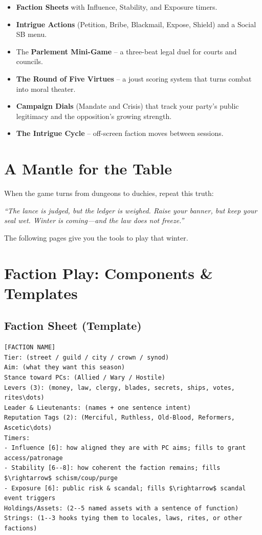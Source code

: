 \documentclass[11pt]{article}
\begin{document}
\begin{itemize}
    \item \textbf{Faction Sheets} with Influence, Stability, and Exposure timers.
    \item \textbf{Intrigue Actions} (Petition, Bribe, Blackmail, Expose, Shield) and a Social SB menu.
    \item The \textbf{Parlement Mini-Game} -- a three-beat legal duel for courts and councils.
    \item \textbf{The Round of Five Virtues} -- a joust scoring system that turns combat into moral theater.
    \item \textbf{Campaign Dials} (Mandate and Crisis) that track your party's public legitimacy and the opposition's growing strength.
    \item \textbf{The Intrigue Cycle} -- off-screen faction moves between sessions.
\end{itemize}

\section*{A Mantle for the Table}

When the game turns from dungeons to duchies, repeat this truth:

\medskip
\noindent\textit{``The lance is judged, but the ledger is weighed. Raise your banner, but keep your seal wet. Winter is coming---and the law does not freeze.''}

\medskip
The following pages give you the tools to play that winter.

\section{Faction Play: Components \& Templates}
\subsection{Faction Sheet (Template)}
\begin{verbatim}
[FACTION NAME]
Tier: (street / guild / city / crown / synod)
Aim: (what they want this season)
Stance toward PCs: (Allied / Wary / Hostile)
Levers (3): (money, law, clergy, blades, secrets, ships, votes, rites\dots)
Leader & Lieutenants: (names + one sentence intent)
Reputation Tags (2): (Merciful, Ruthless, Old-Blood, Reformers, Ascetic\dots)
Timers:
- Influence [6]: how aligned they are with PC aims; fills to grant access/patronage
- Stability [6--8]: how coherent the faction remains; fills $\rightarrow$ schism/coup/purge
- Exposure [6]: public risk & scandal; fills $\rightarrow$ scandal event triggers
Holdings/Assets: (2--5 named assets with a sentence of function)
Strings: (1--3 hooks tying them to locales, laws, rites, or other factions)
\end{verbatim}
\end{document}
